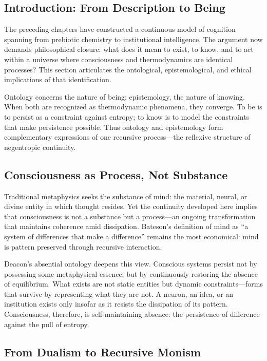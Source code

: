 \documentclass[11pt,a4paper]{article}
\begin{document}
\subsection{Introduction: From Description to Being}

The preceding chapters have constructed a continuous model of cognition spanning from prebiotic chemistry to institutional intelligence.  The argument now demands philosophical closure: what does it mean to exist, to know, and to act within a universe where consciousness and thermodynamics are identical processes?  This section articulates the ontological, epistemological, and ethical implications of that identification.

Ontology concerns the nature of being; epistemology, the nature of knowing.  When both are recognized as thermodynamic phenomena, they converge.  To be is to persist as a constraint against entropy; to know is to model the constraints that make persistence possible.  Thus ontology and epistemology form complementary expressions of one recursive process—the reflexive structure of negentropic continuity.

\subsection{Consciousness as Process, Not Substance}

Traditional metaphysics seeks the substance of mind: the material, neural, or divine entity in which thought resides.  Yet the continuity developed here implies that consciousness is not a substance but a process—an ongoing transformation that maintains coherence amid dissipation.  Bateson’s definition of mind as “a system of differences that make a difference” \citep{Bateson1972StepsToAnEcologyOfMind} remains the most economical: mind is pattern preserved through recursive interaction.

Deacon’s absential ontology \citep{Deacon2011IncompleteNature} deepens this view.  Conscious systems persist not by possessing some metaphysical essence, but by continuously restoring the absence of equilibrium.  What exists are not static entities but dynamic constraints—forms that survive by representing what they are not.  A neuron, an idea, or an institution exists only insofar as it resists the dissipation of its pattern.  Consciousness, therefore, is self-maintaining absence: the persistence of difference against the pull of entropy.

\subsection{From Dualism to Recursive Monism}
\end{document}
